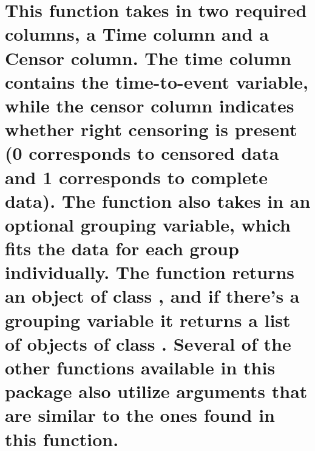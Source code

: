 \hypertarget{this-function-takes-in-two-required-columns-a-time-column-and-a-censor-column.-the-time-column-contains-the-time-to-event-variable-while-the-censor-column-indicates-whether-right-censoring-is-present-0-corresponds-to-censored-data-and-1-corresponds-to-complete-data.-the-function-also-takes-in-an-optional-grouping-variable-which-fits-the-data-for-each-group-individually.-the-function-returns-an-object-of-class-and-if-theres-a-grouping-variable-it-returns-a-list-of-objects-of-class-.-several-of-the-other-functions-available-in-this-package-also-utilize-arguments-that-are-similar-to-the-ones-found-in-this-function.}{%
\section{\texorpdfstring{This function takes in two required columns, a
Time column and a Censor column. The time column contains the
time-to-event variable, while the censor column indicates whether right
censoring is present (0 corresponds to censored data and 1 corresponds
to complete data). The function also takes in an optional grouping
variable, which fits the data for each group individually. The function
returns an object of class , and if there's a grouping
variable it returns a list of objects of class .
Several of the other functions available in this package also utilize
arguments that are similar to the ones found in this
function.}{This function takes in two required columns, a Time column and a Censor column. The time column contains the time-to-event variable, while the censor column indicates whether right censoring is present (0 corresponds to censored data and 1 corresponds to complete data). The function also takes in an optional grouping variable, which fits the data for each group individually. The function returns an object of class , and if there's a grouping variable it returns a list of objects of class . Several of the other functions available in this package also utilize arguments that are similar to the ones found in this function.}}\label{this-function-takes-in-two-required-columns-a-time-column-and-a-censor-column.-the-time-column-contains-the-time-to-event-variable-while-the-censor-column-indicates-whether-right-censoring-is-present-0-corresponds-to-censored-data-and-1-corresponds-to-complete-data.-the-function-also-takes-in-an-optional-grouping-variable-which-fits-the-data-for-each-group-individually.-the-function-returns-an-object-of-class-and-if-theres-a-grouping-variable-it-returns-a-list-of-objects-of-class-.-several-of-the-other-functions-available-in-this-package-also-utilize-arguments-that-are-similar-to-the-ones-found-in-this-function.}}

